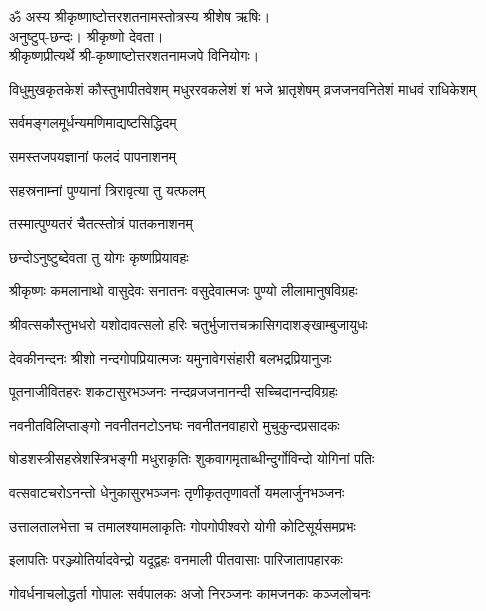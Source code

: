 ॐ अस्य श्रीकृष्णाष्टोत्तरशतनामस्तोत्रस्य श्रीशेष ऋषिः।\\
अनुष्टुप्-छन्दः। श्रीकृष्णो देवता।\\
 श्रीकृष्णप्रीत्यर्थे श्री-कृष्णाष्टोत्तरशतनामजपे विनियोगः।

{विधुमुखकृतकेशं कौस्तुभापीतवेशम्}
{मधुररवकलेशं शं भजे भ्रातृशेषम्}
{व्रजजनवनितेशं माधवं राधिकेशम्}


{सर्वमङ्गलमूर्धन्यमणिमाद्यष्टसिद्धिदम्}

{समस्तजपयज्ञानां फलदं पापनाशनम्}

{सहस्रनाम्नां पुण्यानां त्रिरावृत्या तु यत्फलम्}

{तस्मात्पुण्यतरं चैतत्स्तोत्रं पातकनाशनम्}

{छन्दोऽनुष्टुब्देवता तु योगः कृष्णप्रियावहः}

\twolineshloka
{श्रीकृष्णः कमलानाथो वासुदेवः सनातनः}
{वसुदेवात्मजः पुण्यो लीलामानुषविग्रहः}

\twolineshloka
{श्रीवत्सकौस्तुभधरो यशोदावत्सलो हरिः}
{चतुर्भुजात्तचक्रासिगदाशङ्खाम्बुजायुधः}

\twolineshloka
{देवकीनन्दनः श्रीशो नन्दगोपप्रियात्मजः}
{यमुनावेगसंहारी बलभद्रप्रियानुजः}

\twolineshloka
{पूतनाजीवितहरः शकटासुरभञ्जनः}
{नन्दव्रजजनानन्दी सच्चिदानन्दविग्रहः}

\twolineshloka
{नवनीतविलिप्ताङ्गो नवनीतनटोऽनघः}
{नवनीतनवाहारो मुचुकुन्दप्रसादकः}

\twolineshloka
{षोडशस्त्रीसहस्रेशस्त्रिभङ्गी मधुराकृतिः}
{शुकवागमृताब्धीन्दुर्गोविन्दो योगिनां पतिः}

\twolineshloka
{वत्सवाटचरोऽनन्तो धेनुकासुरभञ्जनः}
{तृणीकृततृणावर्तो यमलार्जुनभञ्जनः}

\twolineshloka
{उत्तालतालभेत्ता च तमालश्यामलाकृतिः}
{गोपगोपीश्वरो योगी कोटिसूर्यसमप्रभः}

\twolineshloka
{इलापतिः परञ्ज्योतिर्यादवेन्द्रो यदूद्वहः}
{वनमाली पीतवासाः पारिजातापहारकः}

\twolineshloka
{गोवर्धनाचलोद्धर्ता गोपालः सर्वपालकः}
{अजो निरञ्जनः कामजनकः कञ्जलोचनः}

